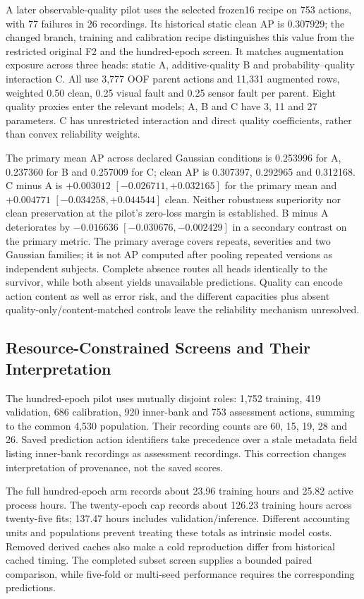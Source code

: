 A later observable-quality pilot uses the selected frozen16 recipe on 753 actions, with 77 failures in 26 recordings. Its historical static clean AP is 0.307929; the changed branch, training and calibration recipe distinguishes this value from the restricted original F2 and the hundred-epoch screen. It matches augmentation exposure across three heads: static A, additive-quality B and probability--quality interaction C. All use 3,777 OOF parent actions and 11,331 augmented rows, weighted 0.50 clean, 0.25 visual fault and 0.25 sensor fault per parent. Eight quality proxies enter the relevant models; A, B and C have 3, 11 and 27 parameters. C has unrestricted interaction and direct quality coefficients, rather than convex reliability weights.

The primary mean AP across declared Gaussian conditions is 0.253996 for A, 0.237360 for B and 0.257009 for C; clean AP is 0.307397, 0.292965 and 0.312168. C minus A is $+0.003012$ $[-0.026711,+0.032165]$ for the primary mean and $+0.004771$ $[-0.034258,+0.044544]$ clean. Neither robustness superiority nor clean preservation at the pilot's zero-loss margin is established. B minus A deteriorates by $-0.016636$ $[-0.030676,-0.002429]$ in a secondary contrast on the primary metric. The primary average covers repeats, severities and two Gaussian families; it is not AP computed after pooling repeated versions as independent subjects. Complete absence routes all heads identically to the survivor, while both absent yields unavailable predictions. Quality can encode action content as well as error risk, and the different capacities plus absent quality-only/content-matched controls leave the reliability mechanism unresolved.

\subsection{Resource-Constrained Screens and Their Interpretation}
The hundred-epoch pilot uses mutually disjoint roles: 1,752 training, 419 validation, 686 calibration, 920 inner-bank and 753 assessment actions, summing to the common 4,530 population. Their recording counts are 60, 15, 19, 28 and 26. Saved prediction action identifiers take precedence over a stale metadata field listing inner-bank recordings as assessment recordings. This correction changes interpretation of provenance, not the saved scores.

The full hundred-epoch arm records about 23.96 training hours and 25.82 active process hours. The twenty-epoch cap records about 126.23 training hours across twenty-five fits; 137.47 hours includes validation/inference. Different accounting units and populations prevent treating these totals as intrinsic model costs. Removed derived caches also make a cold reproduction differ from historical cached timing. The completed subset screen supplies a bounded paired comparison, while five-fold or multi-seed performance requires the corresponding predictions.

